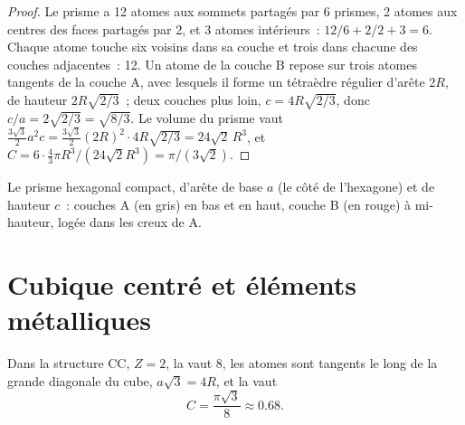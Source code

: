 \begin{proof}
Le prisme a 12 atomes aux sommets partagés par 6 prismes, 2 atomes aux
centres des faces partagés par 2, et 3 atomes intérieurs~:
$12/6 + 2/2 + 3 = 6$. Chaque atome touche six voisins dans sa couche et
trois dans chacune des couches adjacentes~: 12. Un atome de la couche B
repose sur trois atomes tangents de la couche A, avec lesquels il forme
un tétraèdre régulier d'arête $2R$, de hauteur $2R\sqrt{2/3}$~; deux
couches plus loin, $c = 4R\sqrt{2/3}$, donc $c/a = 2\sqrt{2/3} = \sqrt{8/3}$.
Le volume du prisme vaut $\frac{3\sqrt3}{2}a^2 c = \frac{3\sqrt3}{2}(2R)^2 \cdot
4R\sqrt{2/3} = 24\sqrt2\,R^3$, et $C = 6 \cdot \frac43\pi R^3/(24\sqrt2
R^3) = \pi/(3\sqrt2)$.
\end{proof}

\begin{omfigure}

{\small Le prisme hexagonal compact, d'arête de base $a$ (le côté de
l'hexagone) et de hauteur $c$~: couches A (en gris) en bas et en haut,
couche B (en rouge) à mi-hauteur, logée dans les creux de A.}
\end{omfigure}

\section{Cubique centré et éléments métalliques}

\begin{proposition}\label{prop:b1:crystals-metals:bcc}
Dans la structure CC, $Z = 2$, la  vaut 8, les atomes sont
tangents le long de la grande diagonale du cube, $a\sqrt3 = 4R$, et la
 vaut
\[
  C = \frac{\pi\sqrt3}{8} \approx 0.68 .
\]
\end{proposition}

